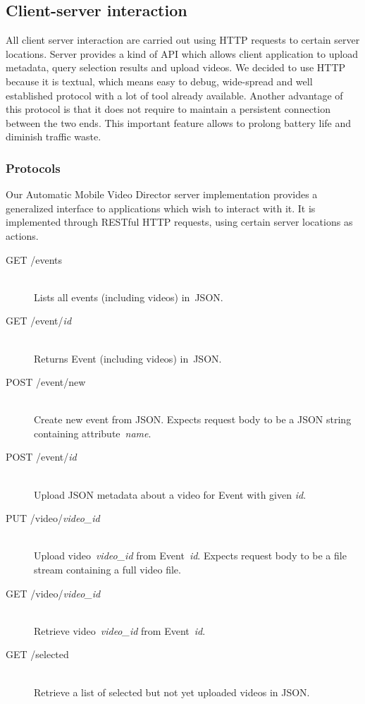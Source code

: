 \documentclass[conference]{IEEEtran}
\begin{document}
\subsection{Client-server interaction}

All client server interaction are carried out using HTTP requests to certain server locations.
Server provides a kind of API which allows client application to upload metadata, query selection results and upload videos.
We decided to use HTTP because it is textual, which means easy to debug, 
wide-spread and well established protocol with a lot of tool already available. 
Another advantage of this protocol is that it does not require to maintain a persistent connection between the two ends.
This important feature allows to prolong battery life and diminish traffic waste.


\subsubsection{Protocols}

Our Automatic Mobile Video Director server implementation provides 
a generalized interface to applications which wish to interact with it. 
It is implemented through RESTful HTTP requests, using certain server locations as actions.

\begin{description}
	\item[GET /events]\hfill\\
		Lists all events (including videos) in~JSON.
		
	\item[GET /event/\textit{id}]\hfill\\
		Returns Event (including videos) in~JSON.
				
	\item[POST /event/new]\hfill\\
		Create new event from JSON.
		Expects request body to be a JSON string containing attribute~\textit{name}.
		
	\item[POST /event/\textit{id}]\hfill\\
		Upload JSON metadata about a video for Event with given \textit{id}.
		
	\item[PUT /video/\textit{video\_id}]\hfill\\
		Upload video~\textit{video\_id} from Event~\textit{id}.
		Expects request body to be a file stream containing a full video file.
		
	\item[GET /video/\textit{video\_id}]\hfill\\
		Retrieve video~\textit{video\_id} from Event~\textit{id}.
		
	\item[GET /selected]\hfill\\
		Retrieve a list of selected but not yet uploaded videos in JSON.	
		
\end{description}
\end{document}
